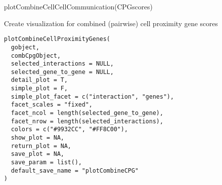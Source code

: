 \documentclass[a4paper]{book}
\begin{document}
%
\begin{Examples}
\begin{ExampleCode}
    plotCombineCellCellCommunication(CPGscores)
\end{ExampleCode}
\end{Examples}
%
\begin{Description}\relax
Create visualization for combined (pairwise) cell proximity gene scores
\end{Description}
%
\begin{Usage}
\begin{verbatim}
plotCombineCellProximityGenes(
  gobject,
  combCpgObject,
  selected_interactions = NULL,
  selected_gene_to_gene = NULL,
  detail_plot = T,
  simple_plot = F,
  simple_plot_facet = c("interaction", "genes"),
  facet_scales = "fixed",
  facet_ncol = length(selected_gene_to_gene),
  facet_nrow = length(selected_interactions),
  colors = c("#9932CC", "#FF8C00"),
  show_plot = NA,
  return_plot = NA,
  save_plot = NA,
  save_param = list(),
  default_save_name = "plotCombineCPG"
)
\end{verbatim}
\end{Usage}
%
\end{document}
